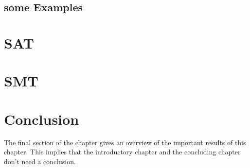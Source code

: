 \subsection{some Examples}

\section{SAT}
\label{CS:SAT}

\section{SMT}
\label{CS:SMT}


\section{Conclusion}
\label{CS:conclusion}
The final section of the chapter gives an overview of the important results
of this chapter. This implies that the introductory chapter and the
concluding chapter don't need a conclusion.

